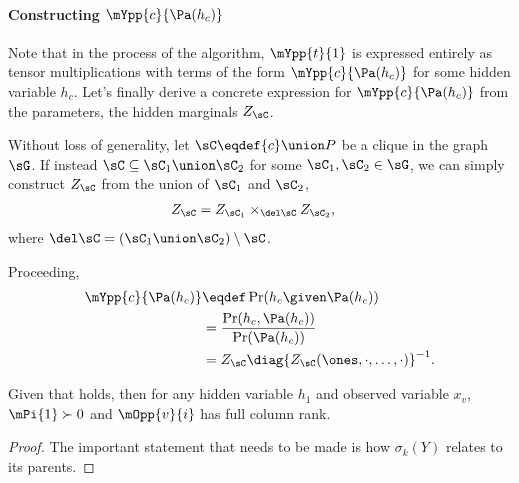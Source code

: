 \paragraph{Constructing $\mYpp{c}{\Pa(h_c)}$}

Note that in the process of the algorithm, $\mYpp{t}{1}$ is expressed
entirely as tensor multiplications with terms of the form
$\mYpp{c}{\Pa(h_c)}$ for some hidden variable $h_c$.  Let's finally
derive a concrete expression for $\mYpp{c}{\Pa(h_c)}$ from the
parameters, the hidden marginals $Z_\sC$.

Without loss of generality, let $\sC \eqdef \{c\} \union P$ be a clique
  in the graph $\sG$.
If instead $\sC \subseteq \sC_1 \union \sC_2$ for some $\sC_1, \sC_2 \in
  \sG$, we can simply construct $Z_{\sC}$ from the union of $\sC_1$ and
  $\sC_2$,
\begin{align*}
  Z_\sC &= Z_{\sC_1} \times_{\del \sC} Z_{\sC_2},
\end{align*}
where $\del \sC = (\sC_1 \union \sC_2) \setminus \sC$.

Proceeding,
\begin{align*}
\mYpp{c}{\Pa(h_c)} 
  &\eqdef \Pr(h_c \given \Pa(h_c)) \\
  &= \frac{\Pr(h_c, \Pa(h_c))}{\Pr(\Pa(h_c))} \\
  &= Z_\sC \diag{Z_\sC(\ones, \cdot, \ldots, \cdot)}^{-1}.
\end{align*}

\begin{lemma}
  \label{lem:full-rank-suff}
  Given that  holds, then for any hidden
  variable $h_1$ and observed variable $x_v$, $\mPi{1} \succ 0$ and
  $\mOpp{v}{i}$ has full column rank.
\end{lemma}
\begin{proof}
  The important statement that needs to be made is how $\sigma_k(Y)$
  relates to its parents.
\end{proof}


